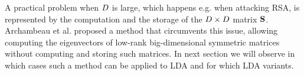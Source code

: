 A practical problem when $D$ is large, which happens e.g. when attacking RSA, is represented by the computation and the storage of the $D\times D$ matrix $\textbf{S}$. Archambeau et al. \cite{TAprincipal} proposed a method that circumvents this issue, allowing computing the eigenvectors of low-rank big-dimensional symmetric matrices without computing and storing such matrices. In next section we will observe in which cases such a method can be applied to LDA and for which LDA variants.



